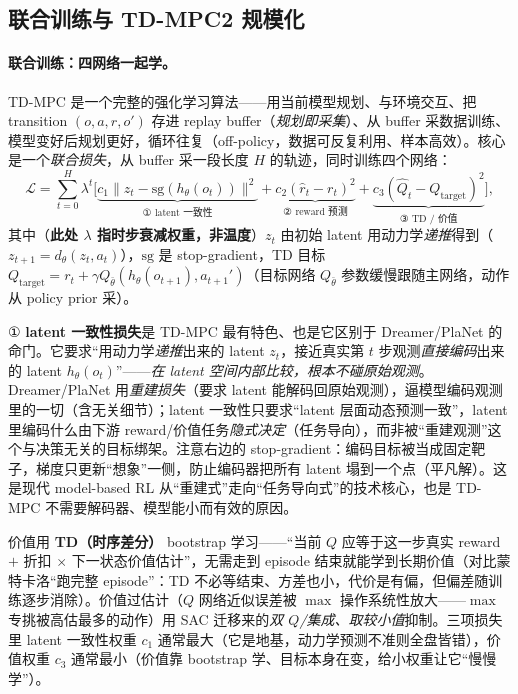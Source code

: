 \subsection{联合训练与 TD-MPC2 规模化}
\label{sec:mv-tdmpc-train}

\paragraph{联合训练：四网络一起学。}
TD-MPC 是一个完整的强化学习算法——用当前模型规划、与环境交互、把 transition $(o,a,r,o')$ 存进 replay buffer（\emph{规划即采集}）、从 buffer 采数据训练、模型变好后规划更好，循环往复（off-policy，数据可反复利用、样本高效）。核心是一个\emph{联合损失}，从 buffer 采一段长度 $H$ 的轨迹，同时训练四个网络\cite{hansen2022tdmpc}：
\begin{equation}
  \mathcal{L}=\sum_{t=0}^{H}\lambda^t\Big[\underbrace{c_1\|z_t-\mathrm{sg}(h_\theta(o_t))\|^2}_{\text{① latent 一致性}}+\underbrace{c_2(\hat r_t-r_t)^2}_{\text{② reward 预测}}+\underbrace{c_3(\hat Q_t-Q_{\text{target}})^2}_{\text{③ TD / 价值}}\Big],
  \label{eq:mv-tdmpc-loss}
\end{equation}
其中（\textbf{此处 $\lambda$ 指时步衰减权重，非温度}）$z_t$ 由初始 latent 用动力学\emph{递推}得到（$z_{t+1}=d_\theta(z_t,a_t)$），$\mathrm{sg}$ 是 stop-gradient，TD 目标 $Q_{\text{target}}=r_t+\gamma Q_{\bar\theta}(h_\theta(o_{t+1}),a_{t+1}')$（目标网络 $Q_{\bar\theta}$ 参数缓慢跟随主网络，动作从 policy prior 采）。

\begin{insight}
① \textbf{latent 一致性损失}是 TD-MPC 最有特色、也是它区别于 Dreamer/PlaNet 的命门。它要求“用动力学\emph{递推}出来的 latent $z_t$，接近真实第 $t$ 步观测\emph{直接编码}出来的 latent $h_\theta(o_t)$”——\emph{在 latent 空间内部比较，根本不碰原始观测}。Dreamer/PlaNet 用\emph{重建损失}（要求 latent 能解码回原始观测），逼模型编码观测里的一切（含无关细节）；latent 一致性只要求“latent 层面动态预测一致”，latent 里编码什么由下游 reward/价值任务\emph{隐式决定}（任务导向），而非被“重建观测”这个与决策无关的目标绑架。注意右边的 stop-gradient：编码目标被当成固定靶子，梯度只更新“想象”一侧，防止编码器把所有 latent 塌到一个点（平凡解）。这是现代 model-based RL 从“重建式”走向“任务导向式”的技术核心，也是 TD-MPC 不需要解码器、模型能小而有效的原因。
\end{insight}

\noindent 价值用 \textbf{TD（时序差分）} bootstrap 学习——“当前 $Q$ 应等于这一步真实 reward $+$ 折扣 $\times$ 下一状态价值估计”，无需走到 episode 结束就能学到长期价值（对比蒙特卡洛“跑完整 episode”：TD 不必等结束、方差也小，代价是有偏，但偏差随训练逐步消除）。价值过估计（$Q$ 网络近似误差被 $\max$ 操作系统性放大——$\max$ 专挑被高估最多的动作）用 SAC 迁移来的\emph{双 $Q$/集成、取较小值}抑制。三项损失里 latent 一致性权重 $c_1$ 通常最大（它是地基，动力学预测不准则全盘皆错），价值权重 $c_3$ 通常最小（价值靠 bootstrap 学、目标本身在变，给小权重让它“慢慢学”）。

